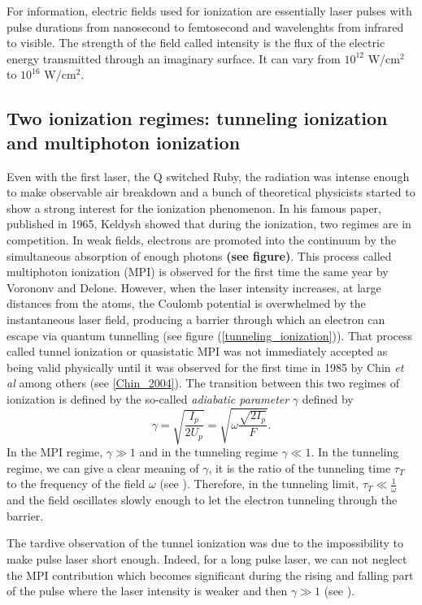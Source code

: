 \documentclass[a4paper]{article}
\begin{document}
For information, electric fields used for ionization are essentially laser pulses with pulse durations from nanosecond to femtosecond and wavelenghts from infrared to visible.
The strength of the field called intensity is the flux of the electric energy transmitted through an imaginary surface. It can vary from $10^{12}$ W/cm$^{2}$ to $10^{16}$ W/cm$^{2}$.
 

\subsection{Two ionization regimes: tunneling ionization and multiphoton ionization}
Even with the first laser, the Q switched Ruby, the radiation was intense enough to make observable air breakdown and a bunch of theoretical physicists started to show a strong interest for the ionization phenomenon. In his famous paper, published in 1965, Keldysh showed that during the ionization, two regimes are in competition. In weak fields, electrons are promoted into the continuum by the simultaneous absorption of enough photons \textbf{(see figure)}. This process called multiphoton ionization (MPI) is observed for the first time the same year by Vorononv and Delone. However, when the laser intensity increases, at large distances from the atoms, the Coulomb potential is overwhelmed by the instantaneous laser field, producing a barrier through which an electron can escape via quantum tunnelling (see figure (\ref{tunneling_ionization})). That process called tunnel ionization or quasistatic MPI was not immediately accepted as being valid physically until it was observed for the first time in 1985 by Chin \textit{et al} among others (see \ref{Chin_2004}). The transition between this two regimes of ionization is defined by the so-called \textit{adiabatic parameter} $\gamma$ defined by
\begin{equation}
\gamma=\sqrt{\frac{I_{p}}{2U_{p}}} = \sqrt{\omega\frac{\sqrt{2I_{p}}}{F}}.
\end{equation}
In the MPI regime, $\gamma \gg 1$ and in the tunneling regime $\gamma \ll 1$. In the tunneling regime, we can give a clear meaning of $\gamma$, it is the ratio of the tunneling time $\tau_{T}$ to the frequency of the field $\omega$ (see \cite{Misha_2014}). Therefore, in the tunneling limit, $\tau_{T} \ll \frac{1}{\omega}$ and the field oscillates slowly enough to let the electron tunneling through the barrier. 

The tardive observation of the tunnel ionization was due to the impossibility to make pulse laser short enough. Indeed, for a long pulse laser, we can not neglect the MPI contribution which becomes significant during the rising and falling part of the pulse where the laser intensity is weaker and then $\gamma \gg 1$ (see \cite{Chin_2004}).
\end{document}
